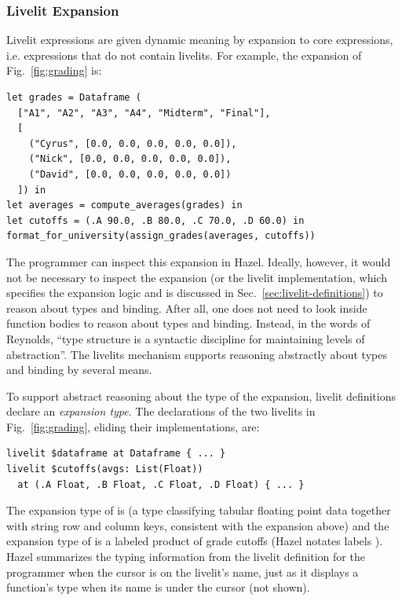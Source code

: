\subsubsection{Livelit Expansion}\label{sec:livelit-expansion}
Livelit expressions are given dynamic meaning by expansion to core expressions, i.e. expressions that do not contain livelits.
For example, the expansion of Fig.~\ref{fig:grading} is:

\begin{lstlisting}
let grades = Dataframe (
  ["A1", "A2", "A3", "A4", "Midterm", "Final"],
  [
    ("Cyrus", [0.0, 0.0, 0.0, 0.0, 0.0]),
    ("Nick", [0.0, 0.0, 0.0, 0.0, 0.0]),
    ("David", [0.0, 0.0, 0.0, 0.0, 0.0])
  ]) in
let averages = compute_averages(grades) in
let cutoffs = (.A 90.0, .B 80.0, .C 70.0, .D 60.0) in
format_for_university(assign_grades(averages, cutoffs))
\end{lstlisting}

The programmer can inspect this expansion in Hazel.
Ideally, however, it would not be necessary to inspect the expansion
(or the livelit implementation, which specifies the expansion logic and is discussed in Sec.~\ref{sec:livelit-definitions})
to reason about types and binding.
After all, one does not need to look inside
function bodies to reason about types and binding.
Instead, in the words of Reynolds,
``type structure is a syntactic discipline for maintaining levels of abstraction''.
The livelits mechanism supports reasoning abstractly about types and binding by
several means.

To support abstract reasoning about the type of the expansion,
livelit definitions declare an \emph{expansion type}.
The declarations of the two livelits in Fig.~\ref{fig:grading},
eliding their implementations, are:
\begin{lstlisting}[numbers=none]
livelit $dataframe at Dataframe { ... }
livelit $cutoffs(avgs: List(Float))
  at (.A Float, .B Float, .C Float, .D Float) { ... }
\end{lstlisting}
The expansion type of  is 
(a type classifying tabular floating point data together with string row and column keys, consistent with the expansion above)
and the expansion type of  is a labeled product of grade cutoffs (Hazel notates labels ).
Hazel summarizes the typing information from the livelit definition for the programmer when the cursor is on the livelit's name,
just as it displays a function's type when its name is under the cursor (not shown).

